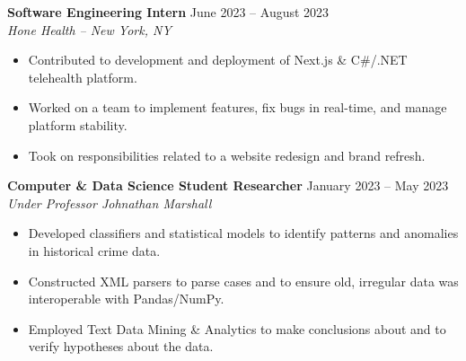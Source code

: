 \documentclass{article}
\begin{document}
\begin{adjustwidth}{1em}{1em}

    \textbf{Software Engineering Intern} \hfill June 2023 -- August 2023 \\
    \textit{Hone Health -- New York, NY}
    \begin{itemize}
        \item Contributed to development and deployment of Next.js & C#/.NET telehealth platform.
        \item Worked on a team to implement features, fix bugs in real-time, and manage platform stability.
        \item Took on responsibilities related to a website redesign and brand refresh. 
    \end{itemize}

    \textbf{Computer \& Data Science Student Researcher} \hfill January 2023 -- May 2023 \\
    \textit{Under Professor Johnathan Marshall}
    \begin{itemize}
        \item Developed classifiers and statistical models to identify patterns and anomalies in historical crime data.
        \item Constructed XML parsers to parse cases and to ensure old, irregular data was interoperable with Pandas/NumPy.
        \item Employed Text Data Mining \& Analytics to make conclusions about and to verify hypotheses about the data.
    \end{itemize}

    \vspace{1mm}

\end{adjustwidth}
\end{document}
